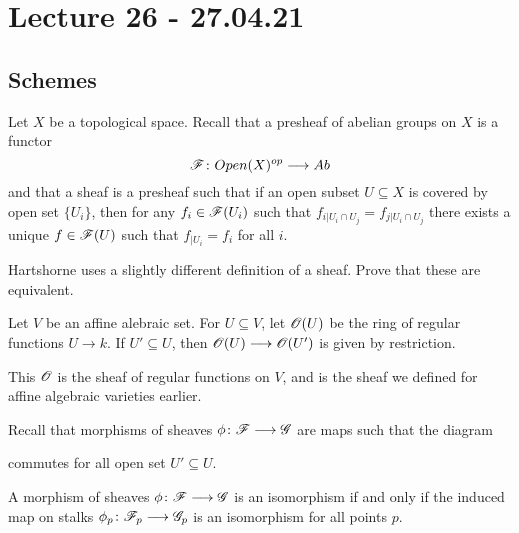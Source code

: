 



\section{Lecture 26 - 27.04.21}

\subsection{Schemes}

Let $X$ be a topological space. Recall that a presheaf of abelian groups on $X$ is a functor 
\begin{equation*}
    \mathscr{F}\colon Open(X)^{op}\longrightarrow Ab
\end{equation*}
and that a sheaf is a presheaf such that if an open subset $U\subseteq X$ is covered by open set $\{ U_i\}$, then for any $f_i\in \mathscr{F}(U_i)$ such that $f_{i|U_i\cap U_j} = f_{j|U_i\cap U_j}$ there exists a unique $f\in \mathscr{F}(U)$ such that $f_{|U_i} = f_i$ for all $i$. 

\begin{problem}
Hartshorne uses a slightly different definition of a sheaf. Prove that these are equivalent. 
\end{problem}

\begin{example}
Let $V$ be an affine alebraic set. For $U\subseteq V$, let $\mathscr{O}(U)$ be the ring of regular functions $U\longrightarrow k$. If $U'\subseteq U$, then $\mathscr{O}(U)\longrightarrow \mathscr{O}(U')$ is given by restriction. 

This $\mathscr{O}$ is the sheaf of regular functions on $V$, and is the sheaf we defined for affine algebraic varieties earlier. 
\end{example}

Recall that morphisms of sheaves $\phi\colon \mathscr{F}\longrightarrow \mathscr{G}$ are maps such that the diagram
\begin{center}
\end{center}
commutes for all open set $U'\subseteq U$. 

\begin{proposition}
A morphism of sheaves $\phi\colon \mathscr{F}\longrightarrow \mathscr{G}$ is an isomorphism if and only if the induced map on stalks $\phi_p\colon \mathscr{F}_p\longrightarrow \mathscr{G}_p$ is an isomorphism for all points $p$. 
\end{proposition}

